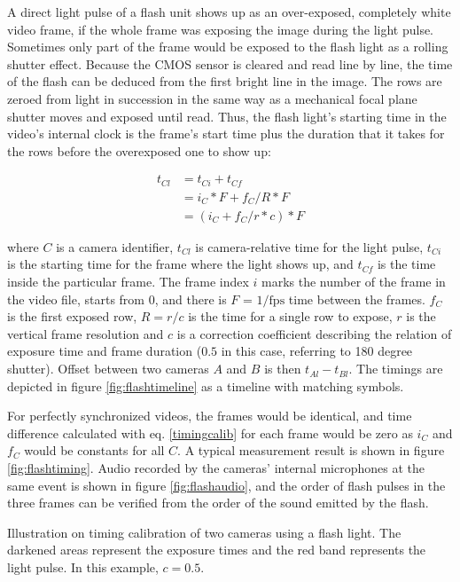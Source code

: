 
A direct light pulse of a flash unit shows up as an over-exposed, completely white video frame, if the whole frame was exposing the image during the light pulse.
Sometimes only part of the frame would be exposed to the flash light as a rolling shutter effect.
Because the CMOS sensor is cleared and read line by line, the time of the flash can be deduced from the first bright line in the image.
The rows are zeroed from light in succession in the same way as a mechanical focal plane shutter moves and exposed until read.
Thus, the flash light's starting time in the video's internal clock is the frame's start time plus the duration that it takes for the rows before the overexposed one to show up:

\begin{align} \label{timingcalib}
t_{Cl} &= t_{Ci} + t_{Cf} \\
&= i_C * F + f_C / R * F \\
&= (i_C + f_C / r * c) * F
\end{align}

where $C$ is a camera identifier, $t_{Cl}$ is camera-relative time for the light pulse, $t_{Ci}$ is the starting time for the frame where the light shows up, and $t_{Cf}$ is the time inside the particular frame.
The frame index $i$ marks the number of the frame in the video file, starts from 0, and there is $F$ = $1/\text{fps}$ time between the frames.
$f_C$ is the first exposed row, $R = r / c$ is the time for a single row to expose, $r$ is the vertical frame resolution and $c$ is a correction coefficient describing the relation of exposure time and frame duration ($0.5$ in this case, referring to 180 degree shutter).
Offset between two cameras $A$ and $B$ is then $t_{Al} - t_{Bl}$.
The timings are depicted in figure \ref{fig:flashtimeline} as a timeline with matching symbols.

For perfectly synchronized videos, the frames would be identical, and time difference calculated with eq. \ref{timingcalib} for each frame would be zero as $i_C$ and $f_C$ would be constants for all $C$.
A typical measurement result is shown in figure \ref{fig:flashtiming}.
Audio recorded by the cameras' internal microphones at the same event is shown in figure \ref{fig:flashaudio}, and the order of flash pulses in the three frames can be verified from the order of the sound emitted by the flash.

{Illustration on timing calibration of two cameras using a flash light.
The darkened areas represent the exposure times and the red band represents the light pulse.
In this example, $c = 0.5$.
}

